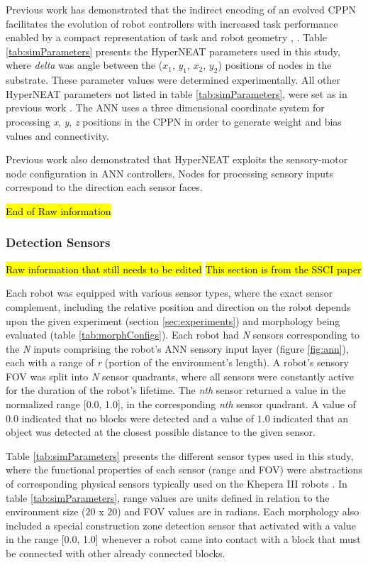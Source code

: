 \documentclass[conference]{IEEEtran}
\begin{document}
Previous work has demonstrated that the indirect encoding of an evolved CPPN facilitates the evolution of
robot controllers with increased task performance enabled by a compact representation
of task and robot geometry \cite{DAmbrosioStanley2008}, \cite{WatsonNitschke2015SSCI}.
Table \ref{tab:simParameters} presents the HyperNEAT parameters used in this study, where \textit{delta}
was angle between the ($x_{1}$, $y_{1}$, $x_{2}$, $y_{2}$) positions of nodes in the substrate.
These parameter values were determined experimentally.   All other HyperNEAT parameters not listed in
table \ref{tab:simParameters}, were set as in previous work \cite{DAmbrosioStanley2008}.
The ANN uses a three dimensional coordinate system for processing \textit{x}, \textit{y}, \textit{z}
positions in the CPPN in order to generate weight and bias values and connectivity.

Previous work  also demonstrated that HyperNEAT exploits the sensory-motor node configuration in ANN controllers,
Nodes for processing sensory inputs correspond to the direction each sensor faces.

\hl{End of Raw information}

\subsubsection{Detection Sensors}

\hl{Raw information that still needs to be edited}
\hl{This section is from the SSCI paper}

Each robot was equipped with various sensor types, where the exact sensor complement, including the
relative position and direction on the robot depends upon the given experiment
(section \ref{sec:experiments}) and morphology being evaluated (table \ref{tab:morphConfigs}).
Each robot had \textit{N} sensors corresponding to the \textit{N} inputs comprising the robot's
ANN sensory input layer (figure \ref{fig:ann}), each with a range of \textit{r}
(portion of the environment's length).
A robot's sensory FOV was split into \textit{N} sensor quadrants, where all sensors were constantly active
for the duration of the robot's lifetime.
The \textit{nth} sensor returned a value in the normalized range [0.0, 1.0],
in the corresponding \textit{nth} sensor quadrant.
A value of $0.0$ indicated that no blocks were detected and a value of $1.0$ indicated that an object was detected
at the closest possible distance to the given sensor.

Table \ref{tab:simParameters} presents the different sensor types used in this study, where the functional properties of each sensor
(range and FOV) were abstractions of corresponding physical sensors typically used on the Khepera III robots \cite{khepera3usermanual2013}.
In table \ref{tab:simParameters}, range values are units defined in relation to the environment size ($20$ x $20$)
and FOV values are in radians.
Each morphology also included a special construction zone detection sensor that activated with a value in the range
[0.0, 1.0] whenever a robot came into
contact with a block that must be connected with other already connected blocks.
\end{document}
